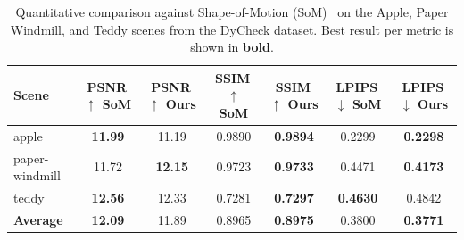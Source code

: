 \begin{table}[t]
  \centering
  \setlength{\tabcolsep}{4.5pt}
  \renewcommand{\arraystretch}{1.25}
  \begin{tabular}{@{}lcccccc@{}}
    \toprule
    \textbf{Scene}
      & \shortstack{\textbf{PSNR\,$\uparrow$}\\ \textbf{SoM}} & \shortstack{\textbf{PSNR\,$\uparrow$}\\ \textbf{Ours}}
      & \shortstack{\textbf{SSIM\,$\uparrow$}\\ \textbf{SoM}} & \shortstack{\textbf{SSIM\,$\uparrow$}\\ \textbf{Ours}}
      & \shortstack{\textbf{LPIPS\,$\downarrow$}\\ \textbf{SoM}} & \shortstack{\textbf{LPIPS\,$\downarrow$}\\ \textbf{Ours}} \\
    \midrule
    \rowcolor{rowgray}
    apple          & \textbf{11.99} & 11.19          & 0.9890 & \textbf{0.9894} & 0.2299          & \textbf{0.2298} \\
    paper-windmill & 11.72          & \textbf{12.15} & 0.9723 & \textbf{0.9733} & 0.4471          & \textbf{0.4173} \\
    \rowcolor{rowgray}
    teddy          & \textbf{12.56} & 12.33          & 0.7281 & \textbf{0.7297} & \textbf{0.4630} & 0.4842          \\
    \textbf{Average} & \textbf{12.09} & 11.89        & 0.8965 & \textbf{0.8975} & 0.3800          & \textbf{0.3771} \\
    \bottomrule
  \end{tabular}
  \caption{Quantitative comparison against Shape-of-Motion (SoM)~\cite{wang2025shape} on the Apple, Paper Windmill, and Teddy scenes from the DyCheck dataset. Best result per metric is shown in \textbf{bold}.}
  \label{tab:quantitative}
\end{table}
